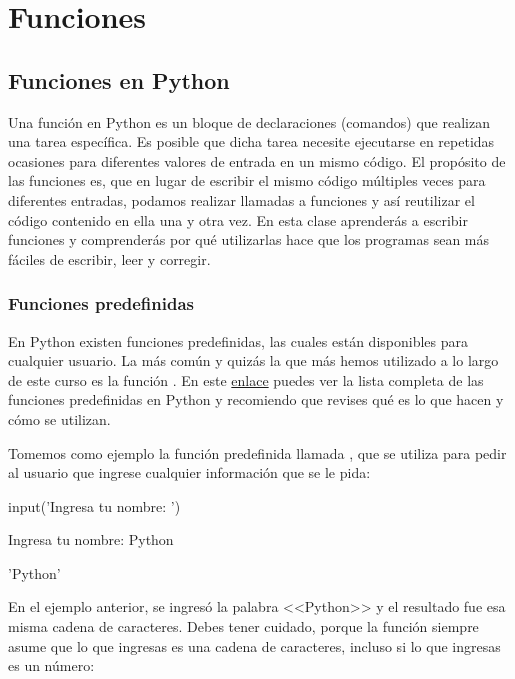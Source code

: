 \chapter{Funciones}

\setcounter{ipythcntr}{0}

\section{Funciones en Python}
Una función en Python es un bloque de declaraciones (comandos) que realizan una tarea específica. Es posible que dicha tarea necesite ejecutarse en repetidas ocasiones para diferentes valores de entrada en un mismo código. El propósito de las funciones es, que en lugar de escribir el mismo código múltiples veces para diferentes entradas, podamos realizar llamadas a funciones y así reutilizar el código contenido en ella una y otra vez. En esta clase aprenderás a escribir funciones y comprenderás por qué utilizarlas hace que los programas sean más fáciles de escribir, leer y corregir.

\subsection{Funciones predefinidas}
En Python existen funciones predefinidas, las cuales están disponibles para cualquier usuario. La más común y quizás la que más hemos utilizado a lo largo de este curso es la función . En este \href{https://docs.python.org/3/library/functions.html}{enlace} puedes ver la lista completa de las funciones predefinidas en Python y recomiendo que revises qué es lo que hacen y cómo se utilizan.

Tomemos como ejemplo la función predefinida llamada , que se utiliza para pedir al usuario que ingrese cualquier información que se le pida:

\begin{pyin}
input('Ingresa tu nombre: ')
\end{pyin}
\begin{pyprint}
Ingresa tu nombre: Python
\end{pyprint}
\begin{pyout}
'Python'
\end{pyout}

En el ejemplo anterior, se ingresó la palabra <<Python>> y el resultado fue esa misma cadena de caracteres. Debes tener cuidado, porque la función  siempre asume que lo que ingresas es una cadena de caracteres, incluso si lo que ingresas es un número:

